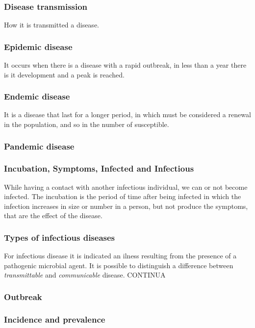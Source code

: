 \subsubsection{Disease transmission} How it is transmitted a disease. 
	
\subsubsection{Epidemic disease} It occurs when there is a disease with a rapid outbreak, in less than a year there is it development and a peak is reached. 

\subsubsection{Endemic disease} It is a disease that last for a longer period, in which must be considered a renewal in the population, and so in the number of susceptible.

\subsubsection{Pandemic disease}

\subsubsection{Incubation, Symptoms, Infected and Infectious}   While having a contact with another infectious individual, we can or not become infected. The incubation is the period of time after being infected in which the infection increases in size or number in a person, but not produce the symptoms, that are the effect of the disease. 

\subsubsection{Types of infectious diseases}
For infectious disease it is indicated an ilness resulting from the presence of a pathogenic microbial agent. It is possible to distinguish a difference between \textit{transmittable} and \textit{communicable} disease. CONTINUA

\subsubsection{Outbreak}

\subsubsection{Incidence and prevalence}

